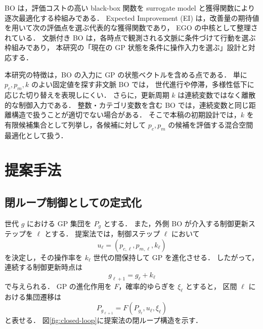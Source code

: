 \documentclass[a4paper,10pt,twocolumn]{ltjsarticle}
\begin{document}
BO は，評価コストの高い black-box 関数を surrogate model と獲得関数により逐次最適化する枠組みである．
Expected Improvement (EI) は，改善量の期待値を用いて次の評価点を選ぶ代表的な獲得関数であり，
EGO の中核として整理されている\cite{jones1998}．
文脈付き BO は，各時点で観測される文脈に条件づけて行動を選ぶ枠組みであり\cite{krause2011}，
本研究の「現在の GP 状態を条件に操作入力を選ぶ」設計と対応する．

本研究の特徴は，BO の入力に GP の状態ベクトルを含める点である．
単に \(p_c,p_m,k\) のよい固定値を探す非文脈 BO では，
世代進行や停滞，多様性低下に応じた切り替えを表現しにくい．
さらに，更新周期 \(k\) は連続変数ではなく離散的な制御入力である．
整数・カテゴリ変数を含む BO では，連続変数と同じ距離構造で扱うことが適切でない場合がある\cite{garrido2020}．
そこで本稿の初期設計では，\(k\) を有限候補集合として列挙し，各候補に対して \(p_c,p_m\) の候補を評価する混合空間最適化として扱う．

\section{提案手法}

\subsection{閉ループ制御としての定式化}

世代 \(g\) における GP 集団を \(P_g\) とする．
また，外側 BO が介入する制御更新ステップを \(\ell\) とする．
提案法では，制御ステップ \(\ell\) において
\[
u_\ell=(p_{c,\ell},p_{m,\ell},k_\ell)
\]
を決定し，その操作率を \(k_\ell\) 世代の間保持して GP を進化させる．
したがって，連続する制御更新時点は
\begin{equation}
g_{\ell+1}=g_\ell+k_\ell
\end{equation}
で与えられる．
GP の進化作用を \(F\)，確率的ゆらぎを \(\xi_\ell\) とすると，
区間 \(\ell\) における集団遷移は
\begin{equation}
P_{g_{\ell+1}} = F(P_{g_\ell},u_\ell,\xi_\ell)
\end{equation}
と表せる．
図\ref{fig:closed-loop}に提案法の閉ループ構造を示す．
\end{document}
